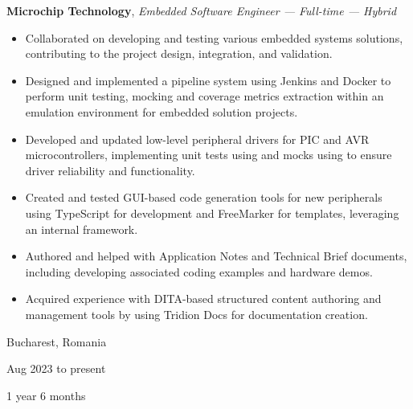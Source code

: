 \documentclass[10pt, a4paper]{article}
\newenvironment{highlights}{
    \begin{itemize}[
        topsep=0.1 cm,
        parsep=0.1 cm,
        partopsep=0pt,
        itemsep=0pt,
        leftmargin=0 cm + 10pt
    ]
}{
    \end{itemize}
} %
\newenvironment{twocolentry}[2][]{
    \onecolentry
    \def\secondColumn{#2}
    \setcolumnwidth{\fill, 3.5 cm}
    \begin{paracol}{2}
}{
    \switchcolumn \raggedleft \secondColumn
    \end{paracol}
    \endonecolentry
} %
\let\hrefWithoutArrow\href
\renewcommand{\href}[2]{\hrefWithoutArrow{#1}{\ifthenelse{\equal{#2}{}}{ }{#2 }\raisebox{.15ex}{\footnotesize \faExternalLink*}}}
\begin{document}
        
        \begin{twocolentry}{
            Bucharest, Romania

        Aug 2023 to present

        1 year 6 months
        }
            \textbf{Microchip Technology}, \textit{Embedded Software Engineer — Full-time — Hybrid}
            \begin{highlights}
                \item Collaborated on developing and testing various embedded systems solutions, contributing to the project design, integration, and validation.
                \item Designed and implemented a pipeline system using Jenkins and Docker to perform unit testing, mocking and coverage metrics extraction within an emulation environment for embedded solution projects.
                \item Developed and updated low-level peripheral drivers for PIC and AVR microcontrollers, implementing unit tests using \href{https://www.throwtheswitch.org/unity}{Unity} and mocks using \href{https://github.com/ThrowTheSwitch/CMock}{CMock} to ensure driver reliability and functionality.
                \item Created and tested GUI-based code generation tools for new peripherals using TypeScript for development and FreeMarker for templates, leveraging an internal framework.
                \item Authored and helped with Application Notes and Technical Brief documents, including developing associated coding examples and hardware demos.
                \item Acquired experience with DITA-based structured content authoring and management tools by using Tridion Docs for documentation creation.
            \end{highlights}
        \end{twocolentry}


        \vspace{0.2 cm}
\end{document}
